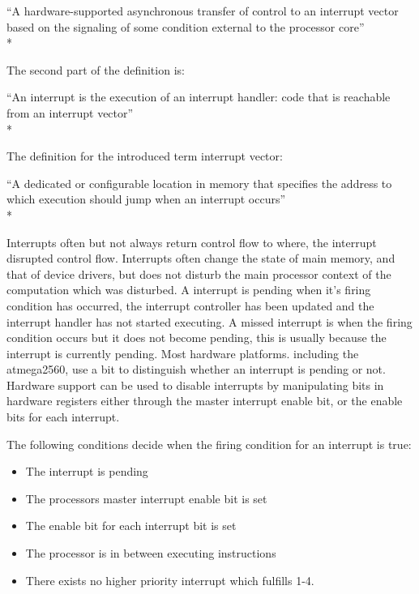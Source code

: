 {\addtolength{\leftskip}{10 mm}
	\enquote{A hardware-supported asynchronous transfer of control to an interrupt vector based on the signaling of some condition external to the processor core}\\*
	
}

The second part of the definition is:

{\addtolength{\leftskip}{10 mm}
	\enquote{An interrupt is the execution of an interrupt handler: code that is reachable from an interrupt vector}\\*
	
}

The definition for the introduced term interrupt vector:

{\addtolength{\leftskip}{10 mm}
	\enquote{A dedicated or configurable location in memory that specifies the address to which execution should jump when an interrupt occurs}\\*
	
}

Interrupts often but not always return control flow to where, the interrupt disrupted control flow\citep{safe}. Interrupts often change the state of main memory, and that of device drivers, but does not disturb the main processor context of the computation which was disturbed.\newline
A interrupt is pending when it's firing condition has occurred, the interrupt controller has been updated and the interrupt handler has not started executing. A missed interrupt is when the firing condition occurs but it does not become pending, this is usually because the interrupt is currently pending\citep{safe}. Most hardware platforms. including the atmega2560, use a bit to distinguish whether an interrupt is pending or not. Hardware support can be used to disable interrupts by manipulating bits in hardware registers either through the master interrupt enable bit, or the enable bits for each interrupt. 

The following conditions decide when the firing condition for an interrupt is true:

\begin{itemize}
	\item The interrupt is pending
	\item The processors master interrupt enable bit is set
	\item The enable bit for each interrupt bit is set
	\item The processor is in between executing instructions
	\item There exists no higher priority interrupt which fulfills 1-4.
\end{itemize}

